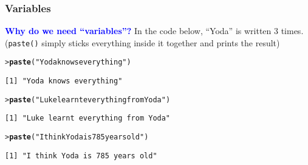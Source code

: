 \documentclass[13pt,aspectratio=169]{beamer}\usepackage[]{graphicx}\usepackage[]{color}
\makeatletter
\newcommand{\hlstr}[1]{\textcolor[rgb]{0.192,0.494,0.8}{#1}}%
\newcommand{\hlstd}[1]{\textcolor[rgb]{0.345,0.345,0.345}{#1}}%
\newcommand{\hlkwd}[1]{\textcolor[rgb]{0.737,0.353,0.396}{\textbf{#1}}}%
\newenvironment{kframe}{%
 \def\at@end@of@kframe{}%
 \ifinner\ifhmode%
  \def\at@end@of@kframe{\end{minipage}}%
  \begin{minipage}{\columnwidth}%
 \fi\fi%
 \def\FrameCommand##1{\hskip\@totalleftmargin \hskip-\fboxsep
 \colorbox{shadecolor}{##1}\hskip-\fboxsep
     \hskip-\linewidth \hskip-\@totalleftmargin \hskip\columnwidth}%
 \MakeFramed {\advance\hsize-\width
   \@totalleftmargin\z@ \linewidth\hsize
   \@setminipage}}%
 {\par\unskip\endMakeFramed%
 \at@end@of@kframe}
\newenvironment{knitrout}{}{} %
\newcommand{\tc}[2]{\textcolor{#1}{#2}}
\renewcommand{\tt}[1]{\texttt{#1}}
\renewenvironment{knitrout}{\setlength{\topsep}{0mm}}{}
\makeatother
\begin{document}
\begin{frame}[fragile]
    \frametitle{Variables }
    \textbf{\tc{Blue}{Why do we need ``variables''?}}
    \vskip10pt
    In the code below, ``Yoda'' is written 3 times. (\tt{paste()} simply sticks
    everything inside it together and prints the result)

\begin{knitrout}\small
{}\color{fgcolor}\begin{kframe}
\begin{alltt}
\hlstd{> }\hlkwd{paste}\hlstd{(}\hlstr{"Yoda knows everything"}\hlstd{)}
\end{alltt}
\begin{verbatim}
[1] "Yoda knows everything"
\end{verbatim}
\begin{alltt}
\hlstd{> }\hlkwd{paste}\hlstd{(}\hlstr{"Luke learnt everything from Yoda"}\hlstd{)}
\end{alltt}
\begin{verbatim}
[1] "Luke learnt everything from Yoda"
\end{verbatim}
\begin{alltt}
\hlstd{> }\hlkwd{paste}\hlstd{(}\hlstr{"I think Yoda is 785 years old"}\hlstd{)}
\end{alltt}
\begin{verbatim}
[1] "I think Yoda is 785 years old"
\end{verbatim}
\end{kframe}
\end{knitrout}

\end{frame}
\end{document}
